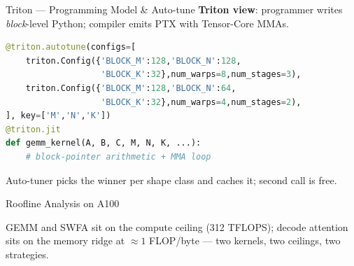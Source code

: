 \documentclass[10pt,aspectratio=169]{beamer}
\begin{document}

\begin{frame}[fragile]{Triton — Programming Model \& Auto-tune}
  \textbf{Triton view}: programmer writes \emph{block}-level Python;
  compiler emits PTX with Tensor-Core MMAs.
  \vspace{1ex}
  \begin{lstlisting}[language=Python]
@triton.autotune(configs=[
    triton.Config({'BLOCK_M':128,'BLOCK_N':128,
                   'BLOCK_K':32},num_warps=8,num_stages=3),
    triton.Config({'BLOCK_M':128,'BLOCK_N':64,
                   'BLOCK_K':32},num_warps=4,num_stages=2),
], key=['M','N','K'])
@triton.jit
def gemm_kernel(A, B, C, M, N, K, ...):
    # block-pointer arithmetic + MMA loop
  \end{lstlisting}
  \vspace{0.5ex}\footnotesize
  Auto-tuner picks the winner per shape class and caches it; second
  call is free.
\end{frame}

\begin{frame}{Roofline Analysis on A100}
  \centering\scriptsize

  \vspace{1ex}
  \footnotesize
  GEMM and SWFA sit on the \alert{compute ceiling} (312 TFLOPS);
  decode attention sits on the \alert{memory ridge} at $\approx 1$
  FLOP/byte — two kernels, two ceilings, two strategies.
\end{frame}
\end{document}
